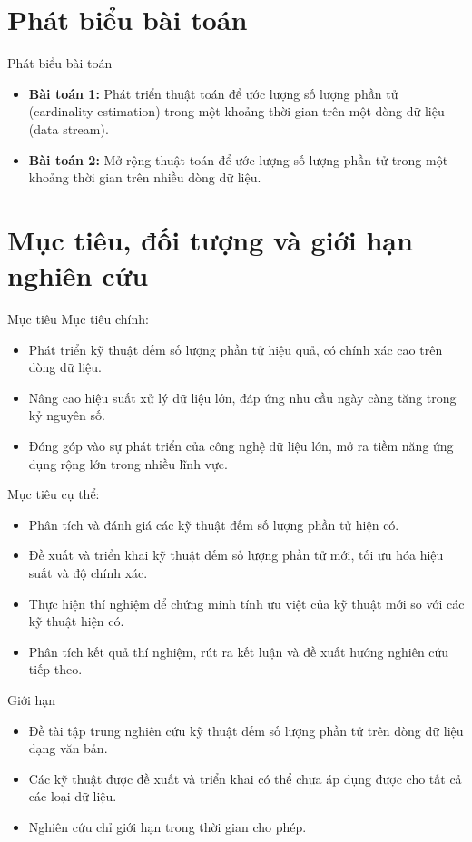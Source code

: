 \documentclass[10pt]{beamer}
\begin{document}
\section{Phát biểu bài toán}
\begin{frame}[fragile]{Phát biểu bài toán}
  \begin{itemize}
    \item \textbf{Bài toán 1:} Phát triển thuật toán để ước lượng số lượng phần tử (cardinality estimation) trong một khoảng thời gian trên một dòng dữ liệu (data stream).
    \item \textbf{Bài toán 2:} Mở rộng thuật toán để ước lượng số lượng phần tử trong một khoảng thời gian trên nhiều dòng dữ liệu.
  \end{itemize}
\end{frame}
\section{Mục tiêu, đối tượng và giới hạn nghiên cứu}

\begin{frame}{Mục tiêu}
  Mục tiêu chính:
  \begin{itemize}
      \item Phát triển kỹ thuật đếm số lượng phần tử hiệu quả, có chính xác cao trên dòng dữ liệu.
      \item Nâng cao hiệu suất xử lý dữ liệu lớn, đáp ứng nhu cầu ngày càng tăng trong kỷ nguyên số.
      \item Đóng góp vào sự phát triển của công nghệ dữ liệu lớn, mở ra tiềm năng ứng dụng rộng lớn trong nhiều lĩnh vực.
  \end{itemize}
  Mục tiêu cụ thể:
  \begin{itemize}
      \item Phân tích và đánh giá các kỹ thuật đếm số lượng phần tử hiện có.
      \item Đề xuất và triển khai kỹ thuật đếm số lượng phần tử mới, tối ưu hóa hiệu suất và độ chính xác.
      \item Thực hiện thí nghiệm để chứng minh tính ưu việt của kỹ thuật mới so với các kỹ thuật hiện có.
      \item Phân tích kết quả thí nghiệm, rút ra kết luận và đề xuất hướng nghiên cứu tiếp theo.
  \end{itemize}
\end{frame}

\begin{frame}{Giới hạn}
  \begin{itemize}
    \item Đề tài tập trung nghiên cứu kỹ thuật đếm số lượng phần tử trên dòng dữ liệu dạng văn bản.
    \item Các kỹ thuật được đề xuất và triển khai có thể chưa áp dụng được cho tất cả các loại dữ liệu.
    \item Nghiên cứu chỉ giới hạn trong thời gian cho phép.
  \end{itemize}
\end{frame}
\end{document}
